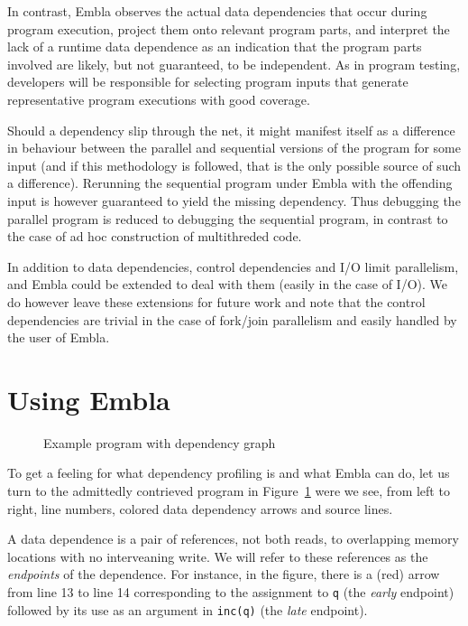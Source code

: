 \documentclass{acm_proc_article-sp}
\begin{document}
In contrast, Embla
observes the actual data dependencies that occur during program
execution, project them onto relevant program parts, and interpret the
lack of a runtime data dependence as an indication that the program
parts involved are likely, but not guaranteed, to be independent.
As in program testing, developers will be responsible for selecting
program inputs that generate representative program executions with
good coverage.

Should a dependency slip through the net, it might manifest itself as a 
difference in behaviour between the parallel and sequential versions of the
program for some input (and if this methodology is followed, that is the only 
possible source of such a difference). Rerunning the sequential program under
Embla with the offending input is however guaranteed to yield the missing 
dependency.
Thus debugging the parallel program is reduced to debugging the sequential 
program, in contrast to the case of ad hoc construction of multithreded
code.

In addition to data dependencies, control dependencies and I/O limit parallelism,
and Embla could be extended to deal with them (easily in the case of I/O). We
do however leave these extensions for future work and note that the control
dependencies are trivial in the case of fork/join parallelism and easily handled 
by the user of Embla.



\section{Using Embla}

\begin{figure} 
\small

\caption{Example program with dependency graph} \label{ffirstex}
\end{figure}

To get a feeling for what dependency profiling is and what Embla can do, 
let us turn to the admittedly contrieved program in Figure~\ref{ffirstex}
were we see, from left to right, line numbers, colored data dependency 
arrows and source lines. 

A data dependence is a pair
of references, not both reads, to overlapping memory
locations with no interveaning write. We will refer to these
references as the {\em endpoints} of the dependence.
For instance, in the figure, 
there is a (red) arrow from line 13 to line 14 corresponding to
the assignment to {\tt q} (the {\em early} endpoint) followed by its use 
as an argument in {\tt inc(q)} (the {\em late} endpoint).
\end{document}
